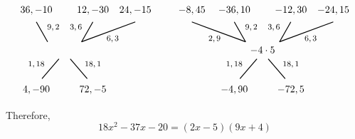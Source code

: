 \documentclass[11pt,letterpaper]{article}
\begin{document}
\[\begin{tikzpicture}
	\node at (-0.4,0.8) {\footnotesize$9, 2$};
	\draw[line width=0.03cm,label={1}] (-0.6,0.3) -- (-1,1);
	\node at (-1,1.4) {$36, -10$};

	\node at (0.4,0.8) {\footnotesize$3, 6$};
	\draw[line width=0.03cm,label={1}] (0.6,0.3) -- (1,1);
	\node at (1,1.4) {$12, -30$};
	
	\node at (1.7,0.4) {\footnotesize$6, 3$};
	\draw[line width=0.03cm,label={1}] (0.6,0.3) -- (2.5,1);
	\node at (2.5,1.4) {$24, -15$};
	
	\node at (-1,-0.5) {\footnotesize$1, 18$};
	\draw[line width=0.03cm,label={1}] (-0.2,-0.3) -- (-0.8,-1);
	\node at (-1,-1.4) {$4, -90$};

	\node at (1,-0.5) {\footnotesize$18, 1$};
	\draw[line width=0.03cm,label={1}] (0.2,-0.3) -- (0.8,-1);
	\node at (1,-1.4) {$72, -5$};

	\tikzset{shift={(7,0)}}
	
	\node at (0,0) {$-4 \cdot 5$};
	
	\node at (-1.7,0.4) {\footnotesize$2, 9$};
	\draw[line width=0.03cm,label={1}] (-0.6,0.3) -- (-2.5,1);
	\node at (-2.5,1.4) {$-8, 45$};
	
	\node at (-0.4,0.8) {\footnotesize$9, 2$};
	\draw[line width=0.03cm,label={1}] (-0.6,0.3) -- (-1,1);
	\node at (-1,1.4) {$-36, 10$};

	\node at (0.4,0.8) {\footnotesize$3, 6$};
	\draw[line width=0.03cm,label={1}] (0.6,0.3) -- (1,1);
	\node at (1,1.4) {$-12, 30$};
	
	\node at (1.7,0.4) {\footnotesize$6, 3$};
	\draw[line width=0.03cm,label={1}] (0.6,0.3) -- (2.5,1);
	\node at (2.5,1.4) {$-24, 15$};
	
	\node at (-1,-0.5) {\footnotesize$1, 18$};
	\draw[line width=0.03cm,label={1}] (-0.2,-0.3) -- (-0.8,-1);
	\node at (-1,-1.4) {$-4, 90$};

	\node at (1,-0.5) {\footnotesize$18, 1$};
	\draw[line width=0.03cm,label={1}] (0.2,-0.3) -- (0.8,-1);
	\node at (1,-1.4) {$-72, 5$};	
	\end{tikzpicture}
	\]

Therefore, 
	\[
	18x^2 - 37x - 20= (2x - 5)(9x + 4)
	\]


\end{document}
